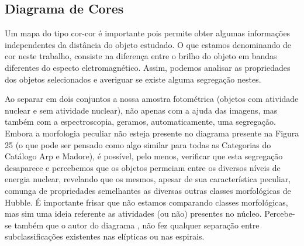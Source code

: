 \subsection{Diagrama de Cores}

Um mapa do tipo cor-cor é importante pois permite obter algumas informações independentes da distância do objeto estudado. O que estamos denominando de cor neste trabalho, consiste na diferença entre o brilho do objeto em bandas
diferentes do especto eletromagnético. Assim, podemos analisar as propriedades dos objetos selecionados e averiguar se existe alguma segregação nestes. 

Ao separar em dois conjuntos a nossa amostra fotométrica (objetos com atividade nuclear e sem atividade nuclear), não apenas com a ajuda das imagens, mas também com a espectroscopia, geramos, automaticamente, uma segregação. Embora a morfologia peculiar não esteja presente no diagrama presente na Figura 25 (o que pode ser pensado como algo similar para todas as Categorias do Catálogo Arp e Madore), é possível, pelo menos, verificar que esta segregação desaparece e percebemos que os objetos permeiam entre os diversos níveis de energia nuclear, revelando que os mesmos, apesar de sua característica peculiar, comunga de propriedades semelhantes as diversas outras classes morfológicas de Hubble. É importante frisar que não estamos comparando classes morfológicas, mas sim uma ideia referente as atividades (ou não) presentes no núcleo. Percebe-se também que o autor do diagrama , não fez qualquer separação entre subclassificações existentes nas elípticas ou nas espirais.

